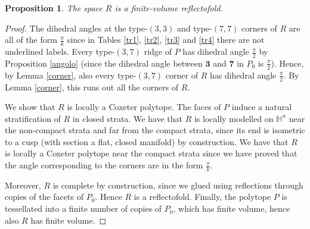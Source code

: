\documentclass{amsart}
\newtheorem{prop}[lemma]{Proposition}
\theoremstyle{definition}
\theoremstyle{remark}
\newcommand{\matH} {\ensuremath {\mathbb{H}}}
\begin{document}
\begin{prop}
\label{loc}
    The space $R$ is a finite-volume reflectofold.
\end{prop}
\begin{proof}
    The dihedral angles at the type-$(3,3)$ and type-$(7,7)$ corners of $R$ are all of the form $\frac{\pi}{k}$ since in Tables \ref{tr1}, \ref{tr2}, \ref{tr3} and \ref{tr4} there are not underlined labels.
    Every type-$(3,7)$ ridge of $P$ has dihedral angle $\frac{\pi}{2}$ by Proposition \ref{angolo} (since the dihedral angle between $\textbf{3}$ and $\textbf{7}$ in $P_0$ is $\frac{\pi}{2}$). Hence, by Lemma \ref{corner}, also every type-$(3,7)$ corner of $R$ has dihedral angle $\frac{\pi}{2}$. By Lemma \ref{corner}, this runs out all the corners of $R$.

    We show that $R$ is locally a Coxeter polytope. The faces of $P$ induce a natural stratification of $R$ in closed strata. We have that $R$ is locally modelled on $\matH^n$ near the non-compact strata and far from the compact strata, since its end is isometric to a cusp (with section a flat, closed manifold) by construction. We have that $R$ is locally a Coxeter polytope near the compact strata since we have proved that the angle corresponding to the corners are in the form $\frac{\pi}{k}$.
    
    Moreover, $R$ is complete by construction, since we glued using reflections through copies of the facets of $P_0$. Hence $R$ is a reflectofold.
    Finally, the polytope $P$ is tessellated into a finite number of copies of $P_0$, which has finite volume, hence also $R$ has finite volume.
\end{proof}
\end{document}
